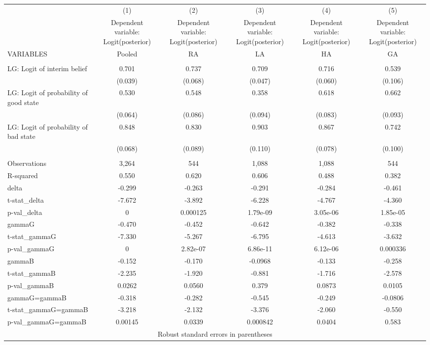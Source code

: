 \documentclass[]{article}
\begin{document}
\begin{tabular}{lccccc} \hline
 & (1) & (2) & (3) & (4) & (5) \\
 & Dependent variable: Logit(posterior) & Dependent variable: Logit(posterior) & Dependent variable: Logit(posterior) & Dependent variable: Logit(posterior) & Dependent variable: Logit(posterior) \\
VARIABLES & Pooled & RA & LA & HA & GA \\ \hline
 &  &  &  &  &  \\
LG: Logit of interim belief & 0.701 & 0.737 & 0.709 & 0.716 & 0.539 \\
 & (0.039) & (0.068) & (0.047) & (0.060) & (0.106) \\
LG: Logit of probability of good state & 0.530 & 0.548 & 0.358 & 0.618 & 0.662 \\
 & (0.064) & (0.086) & (0.094) & (0.083) & (0.093) \\
LG: Logit of probability of bad state & 0.848 & 0.830 & 0.903 & 0.867 & 0.742 \\
 & (0.068) & (0.089) & (0.110) & (0.078) & (0.100) \\
 &  &  &  &  &  \\
Observations & 3,264 & 544 & 1,088 & 1,088 & 544 \\
R-squared & 0.550 & 0.620 & 0.606 & 0.488 & 0.382 \\
delta & -0.299 & -0.263 & -0.291 & -0.284 & -0.461 \\
t-stat\_delta & -7.672 & -3.892 & -6.228 & -4.767 & -4.360 \\
p-val\_delta & 0 & 0.000125 & 1.79e-09 & 3.05e-06 & 1.85e-05 \\
gammaG & -0.470 & -0.452 & -0.642 & -0.382 & -0.338 \\
t-stat\_gammaG & -7.330 & -5.267 & -6.795 & -4.613 & -3.632 \\
p-val\_gammaG & 0 & 2.82e-07 & 6.86e-11 & 6.12e-06 & 0.000336 \\
gammaB & -0.152 & -0.170 & -0.0968 & -0.133 & -0.258 \\
t-stat\_gammaB & -2.235 & -1.920 & -0.881 & -1.716 & -2.578 \\
p-val\_gammaB & 0.0262 & 0.0560 & 0.379 & 0.0873 & 0.0105 \\
gammaG=gammaB & -0.318 & -0.282 & -0.545 & -0.249 & -0.0806 \\
t-stat\_gammaG=gammaB & -3.218 & -2.132 & -3.376 & -2.060 & -0.550 \\
 p-val\_gammaG=gammaB & 0.00145 & 0.0339 & 0.000842 & 0.0404 & 0.583 \\ \hline
\multicolumn{6}{c}{ Robust standard errors in parentheses} \\
\end{tabular}
\end{document}
